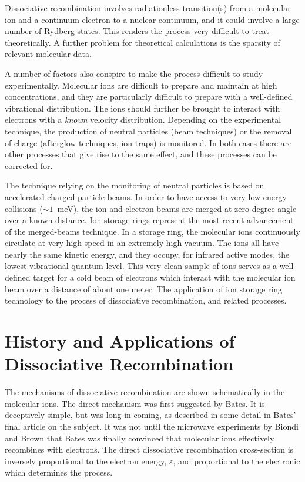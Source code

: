 \documentclass{ws-rv9x6}
\begin{document}
Dissociative recombination involves radiationless transition(s) from a
molecular ion and a continuum electron to a nuclear continuum, and it
could involve a large number of Rydberg states. This renders the
process very difficult to treat theoretically. A further problem for
theoretical calculations is the sparsity of relevant molecular data.

A number of factors also conspire to make the process difficult to
study experimentally. Molecular ions are difficult to prepare and
maintain at high concentrations, and they are particularly difficult
to prepare with a well-defined vibrational distribution. The ions
should further be brought to interact with electrons with a {\it
known\/} velocity distribution. Depending on the experimental
technique, the production of neutral particles (beam techniques) or
the removal of charge (afterglow techniques, ion traps) is
monitored. In both cases there are other processes that give rise to
the same effect, and these processes can be corrected for.

The technique relying on the monitoring of neutral particles is based
on accelerated charged-particle beams. In order to have access to
very-low-energy collisions ($\sim1$~meV), the ion and electron beams
are merged at zero-degree angle over a known distance. Ion storage
rings represent the most recent advancement of the merged-beams
technique. In a storage ring, the molecular ions continuously
circulate at very high speed in an extremely high vacuum. The ions all
have nearly the same kinetic energy, and they occupy, for infrared
active modes, the lowest vibrational quantum level. This very clean
sample of ions serves as a well-defined target for a cold beam of
electrons which interact with the molecular ion beam over a distance
of about one meter. The application of ion storage ring technology to
the process of dissociative recombination, and related processes.

\section{History and Applications of 
Dissociative Recombination \label{seco2}}

The mechanisms of dissociative recombination are shown schematically
in the molecular ions. The direct mechanism was first suggested by
Bates.\cite{1} It is deceptively simple, but was long in coming, as
described in some detail in Bates' final article on the
subject.\cite{2} It was not until the microwave experiments by Biondi
and Brown\cite{3,4} that Bates was finally convinced that molecular
ions effectively recombines with electrons. The direct dissociative
recombination cross-section
is inversely proportional to the electron energy, $\varepsilon$, and
proportional to the electronic which determines 
the process.
\end{document}
